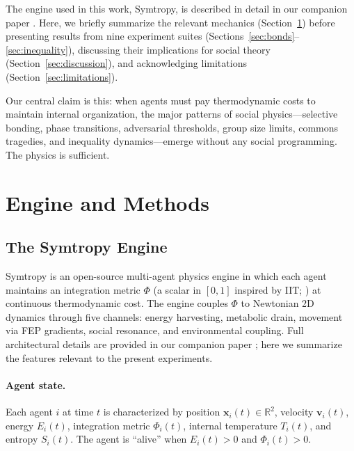 \documentclass[12pt,a4paper]{article}
\begin{document}
The engine used in this work, Symtropy, is described in detail in our companion paper \citep{stoltz2026symtropy}. Here, we briefly summarize the relevant mechanics (Section~\ref{sec:methods}) before presenting results from nine experiment suites (Sections~\ref{sec:bonds}--\ref{sec:inequality}), discussing their implications for social theory (Section~\ref{sec:discussion}), and acknowledging limitations (Section~\ref{sec:limitations}).

Our central claim is this: when agents must pay thermodynamic costs to maintain internal organization, the major patterns of social physics---selective bonding, phase transitions, adversarial thresholds, group size limits, commons tragedies, and inequality dynamics---emerge without any social programming. The physics is sufficient.

\section{Engine and Methods}
\label{sec:methods}

\subsection{The Symtropy Engine}

Symtropy is an open-source multi-agent physics engine in which each agent maintains an integration metric $\Phi$ (a scalar in $[0, 1]$ inspired by IIT; \citealt{tononi2004}) at continuous thermodynamic cost. The engine couples $\Phi$ to Newtonian 2D dynamics through five channels: energy harvesting, metabolic drain, movement via FEP gradients, social resonance, and environmental coupling. Full architectural details are provided in our companion paper \citep{stoltz2026symtropy}; here we summarize the features relevant to the present experiments.

\paragraph{Agent state.} Each agent $i$ at time $t$ is characterized by position $\mathbf{x}_i(t) \in \mathbb{R}^2$, velocity $\mathbf{v}_i(t)$, energy $E_i(t)$, integration metric $\Phi_i(t)$, internal temperature $T_i(t)$, and entropy $S_i(t)$. The agent is ``alive'' when $E_i(t) > 0$ and $\Phi_i(t) > 0$.
\end{document}
